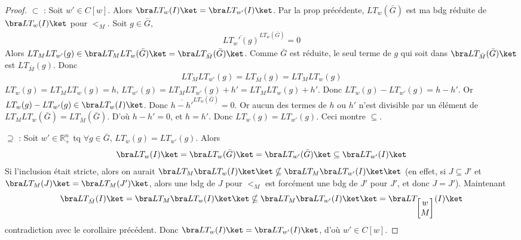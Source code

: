         \begin{proof}
            \item $\subset$ : Soit $w' \in C[w]$. Alors $\bra LT_w(I) \ket = \bra LT_{w'} (I) \ket$. Par la prop précédente, $LT_w(\bar G)$ est ma bdg réduite de $\bra LT_w(I) \ket$ pour $<_M$. Soit $g \in \bar G$,
            \begin{align*}
                \overline{LT_w'(g)}^{LT_w(\bar G)} = 0
            \end{align*}
            Alors $LT_M LT_{w'}(g) \in \bra LT_M LT_w(\bar G) \ket = \bra LT_{\bar M}(\bar G) \ket$. Comme $\bar G$ est réduite, le seul terme de $g$ qui soit dans $\bra LT_{\bar M}(\bar G) \ket$ est $LT_{\bar M}(g)$. Donc
            \begin{align*}
                LT_M LT_{w'}(g) = LT_{\bar M}(g) = LT_M LT_w (g)
            \end{align*}
            $LT_w(g) = LT_M LT_w(g) = h$, $LT_{w'}(g) = LT_M LT_{w'}(g) + h' = LT_M LT_{w}(g) + h'$. Donc $LT_w(g) - LT_{w'}(g) = h - h'$. Or $LT_w(g) - LT_{w'}(g) \in \bra LT_w(I) \ket$. Donc $\overline{h - h'}^{LT_w(\bar G)} = 0$. Or aucun des termes de $h$ ou $h'$ n'est divisible par un élément de $LT_M LT_w(\bar G) = LT_{\bar M}(\bar G)$. D'où $h - h' = 0$, et $h=h'$. Donc $LT_w(g) = LT_{w'}(g)$. Ceci montre $\subseteq$.
            \item $\supseteq$ : Soit $w' \in \mathbb{R}^n_+$ tq $\forall g \in \bar G$, $LT_w(g) = LT_{w'}(g)$. Alors 
            \begin{align*}
                \bra LT_w(I) \ket = \bra LT_w(\bar G) \ket = \bra LT_{w'}(\bar G) \ket \subseteq \bra LT_{w'}(I) \ket 
            \end{align*}
            Si l'inclusion était stricte, alors on aurait $\bra LT_M \bra LT_w(I) \ket \ket \nsubseteq \bra LT_M \bra LT_{w'}(I) \ket \ket$ (en effet, si $J \subseteq J'$ et $\bra LT_M(J) \ket = \bra LT_M(J') \ket$, alors une bdg de $J$ pour $<_M$ est forcément une bdg de $J'$ pour $J'$, et donc $J = J'$). Maintenant
            \begin{align*}
                \bra LT_{\bar M}(I) \ket = \bra LT_M \bra LT_w(I) \ket \ket \nsubseteq \bra LT_M \bra LT_{w'}(I) \ket \ket = \bra LT_{\begin{bmatrix} w \\ M \end{bmatrix}}(I) \ket
            \end{align*}
            contradiction avec le corollaire précédent. Donc $\bra LT_w(I) \ket = \bra LT_{w'}(I) \ket$, d'où $w' \in C[w]$.
        \end{proof}
